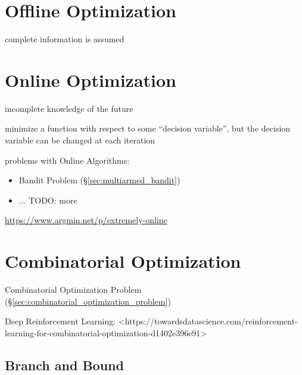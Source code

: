 \section{Offline Optimization}\label{sec:offline_optimization}

complete information is assumed



\section{Online Optimization}\label{sec:online_optimization}

incomplete knowledge of the future

minimize a function with respect to some ``decision variable'', but the decision
variable can be changed at each iteration

problems with Online Algorithms:
\begin{itemize}
  \item Bandit Problem (\S\ref{sec:multiarmed_bandit})
  \item ... TODO: more
\end{itemize}

\url{https://www.argmin.net/p/extremely-online}



\section{Combinatorial Optimization}\label{sec:combinatorial_optimization}

\fist Combinatorial Optimization Problem
(\S\ref{sec:combinatorial_optimization_problem})

Deep Reinforcement Learning:
<https://towardsdatascience.com/reinforcement-learning-for-combinatorial-optimization-d1402e396e91>



\subsection{Branch and Bound}\label{sec:branch_and_bound}

